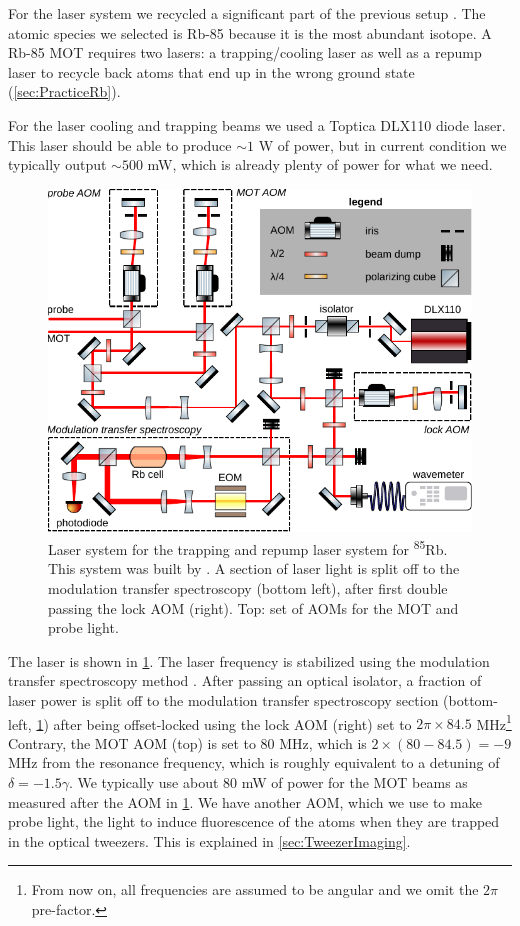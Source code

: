 For the laser system we recycled a significant part of the previous setup \cite{Reijnders2010}.
The atomic species we selected is Rb-85 because it is the most abundant isotope. 
A Rb-85 MOT requires two lasers: a trapping/cooling laser as well as a repump laser to recycle back atoms that end up in the wrong ground state (\cref{sec:PracticeRb}).

For the laser cooling and trapping beams we used a Toptica DLX110 diode laser. This laser should be able to produce $\sim 1$ W of power, but in current condition we typically output $\sim 500$ mW, which is already plenty of power for what we need. 
\begin{figure}[t]
    \centering
    \includegraphics[width=\linewidth]{figures/RbLaserSetup.pdf}
    \caption{Laser system for the trapping and repump laser system for \textsuperscript{85}Rb.
    This system was built by \cite{Reijnders2010}.
    A section of laser light is split off to the modulation transfer spectroscopy (bottom left), after first double passing the lock \ac{AOM} (right). 
    Top: set of AOMs for the MOT and probe light.
    }
    \label{fig:RbLaserSetup}
\end{figure}
The laser is shown in \cref{fig:RbLaserSetup}.
The laser frequency is stabilized using the modulation transfer spectroscopy method \cite{Reijnders2010,McCarron2008}.
After passing an optical isolator, a fraction of laser power is split off to the modulation transfer spectroscopy section (bottom-left, \cref{fig:RbLaserSetup}) after being offset-locked using the lock \ac{AOM} (right) set to $2\pi \times  84.5$ MHz\footnote{From now on, all frequencies are assumed to be angular and we omit the $2\pi$ pre-factor.}
Contrary, the MOT AOM (top) is set to 80 MHz, which is $2 \times (80 - 84.5) = -9$ MHz from the resonance frequency, which is roughly equivalent to a detuning of $\delta = -1.5 \gamma$.
We typically use about $80$ mW of power for the MOT beams as measured after the \ac{AOM} in \cref{fig:RbLaserSetup}.
We have another AOM, which we use to make probe light, the light to induce fluorescence of the atoms when they are trapped in the optical tweezers.
This is explained in \cref{sec:TweezerImaging}.

